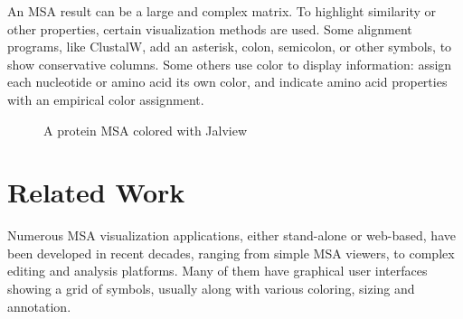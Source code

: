 An MSA result can be a large and complex matrix. To highlight similarity or other properties, certain visualization methods are used. Some alignment programs, like ClustalW, add an asterisk, colon, semicolon, or other symbols, to show conservative columns. Some others use color to display information: assign each nucleotide or amino acid its own color, and indicate amino acid properties with an empirical color assignment.

\begin{figure}[hbt]
\caption[Protein MSA Colored with Jalview]{A protein MSA colored with Jalview \cite{Procter2010aa,Waterhouse:2009fk}}\label{fig:procter-2a}
\end{figure}

\section{Related Work}

Numerous MSA visualization applications, either stand-alone or web-based, have been developed in recent decades, ranging from simple MSA viewers, to complex editing and analysis platforms. Many of them have graphical user interfaces showing a grid of symbols, usually along with various coloring, sizing and annotation. \cite{Procter2010aa}

